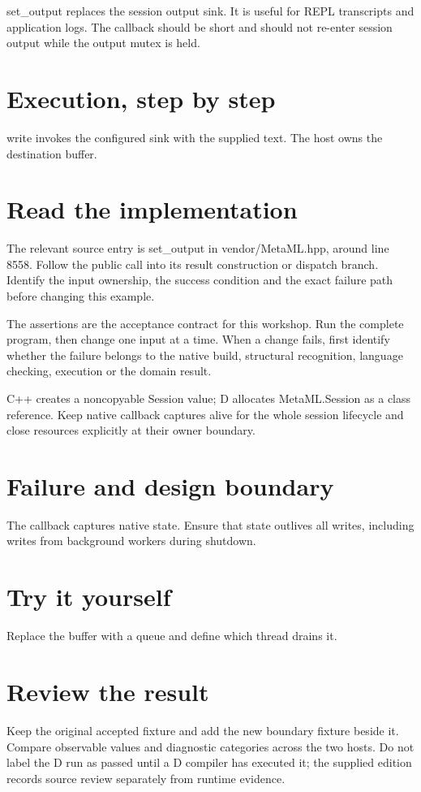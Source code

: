 \clearpage
{}
set\_output replaces the session output sink. It is useful for REPL transcripts and application logs. The callback should be short and should not re-enter session output while the output mutex is held.


\section*{Execution, step by step}
write invokes the configured sink with the supplied text. The host owns the destination buffer.

\section*{Read the implementation}
The relevant source entry is set\_output in vendor/MetaML.hpp, around line 8558. Follow the public call into its result construction or dispatch branch. Identify the input ownership, the success condition and the exact failure path before changing this example.

The assertions are the acceptance contract for this workshop. Run the complete program, then change one input at a time. When a change fails, first identify whether the failure belongs to the native build, structural recognition, language checking, execution or the domain result.

\clearpage
{}
C++ creates a noncopyable Session value; D allocates MetaML.Session as a class reference. Keep native callback captures alive for the whole session lifecycle and close resources explicitly at their owner boundary.


\section*{Failure and design boundary}
The callback captures native state. Ensure that state outlives all writes, including writes from background workers during shutdown.

\section*{Try it yourself}
Replace the buffer with a queue and define which thread drains it.

\section*{Review the result}
Keep the original accepted fixture and add the new boundary fixture beside it. Compare observable values and diagnostic categories across the two hosts. Do not label the D run as passed until a D compiler has executed it; the supplied edition records source review separately from runtime evidence.

